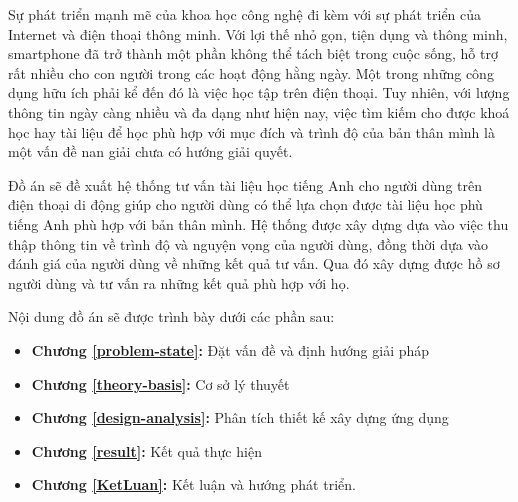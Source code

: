  
\begin{abstracts}         

Sự phát triển mạnh mẽ của khoa học công nghệ đi kèm với sự phát triển của Internet và điện thoại thông minh. Với lợi thế nhỏ gọn, tiện dụng và thông minh, smartphone đã trở thành một phần không thể tách biệt trong cuộc sống, hỗ trợ rất nhiều cho con người trong các hoạt động hằng ngày. Một trong những công dụng hữu ích phải kể đến đó là việc học tập trên điện thoại. Tuy nhiên, với lượng thông tin ngày càng nhiều và đa dạng như hiện nay, việc tìm kiếm cho được khoá học hay tài liệu để học phù hợp với mục đích và trình độ của bản thân mình là một vấn đề nan giải chưa có hướng giải quyết.

Đồ án sẽ đề xuất hệ thống tư vấn tài liệu học tiếng Anh cho người dùng trên điện thoại di động giúp cho người dùng có thể lựa chọn được tài liệu học phù tiếng Anh phù hợp với bản thân mình. Hệ thống được xây dựng dựa vào việc thu thập thông tin về trình độ và nguyện vọng của người dùng, đồng thời dựa vào đánh giá của người dùng về những kết quả tư vấn. Qua đó xây dựng được hồ sơ người dùng và tư vấn ra những kết quả phù hợp với họ.

\textbf{ }
		
Nội dung đồ án sẽ được trình bày dưới các phần sau:
\begin{itemize}
\item \textbf{Chương \ref{problem-state}:}  Đặt vấn đề và định hướng giải pháp
\item \textbf{Chương \ref{theory-basis}:}  Cơ sở lý thuyết
\item \textbf{Chương \ref{design-analysis}:} Phân tích thiết kế xây dựng ứng dụng
\item \textbf{Chương \ref{result}:} Kết quả thực hiện
\item \textbf{Chương \ref{KetLuan}:} Kết luận và hướng phát triển.
\end{itemize}
\end{abstracts}